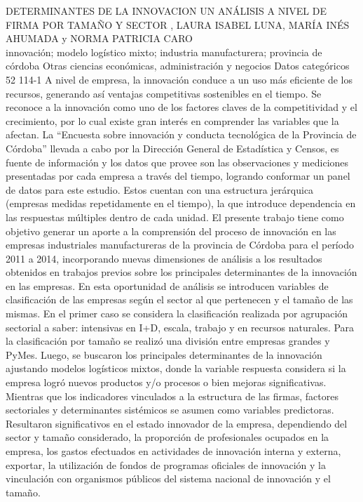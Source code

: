 \A
{DETERMINANTES DE LA INNOVACION UN ANÁLISIS A NIVEL DE FIRMA POR TAMAÑO Y SECTOR}
{, LAURA ISABEL LUNA, MARÍA INÉS AHUMADA y NORMA PATRICIA CARO}
{
\\}
{innovación; modelo logístico mixto; industria manufacturera; provincia de córdoba} 
 {Otras ciencias económicas, administración y negocios} 
 {Datos categóricos} 
 {52} 
 {114-1}
{A nivel de empresa, la innovación conduce a un uso más eficiente de los recursos, generando así ventajas competitivas sostenibles en el tiempo. Se reconoce a la innovación como uno de los factores claves de la competitividad y el crecimiento, por lo cual existe gran interés en comprender las variables que la afectan. La “Encuesta sobre innovación y conducta tecnológica de la Provincia de Córdoba” llevada a cabo por la Dirección General de Estadística y Censos, es fuente de información y los datos que provee son las observaciones y mediciones presentadas por cada empresa a través del tiempo, logrando conformar un panel de datos para este estudio. Estos cuentan con una estructura jerárquica (empresas medidas repetidamente en el tiempo), la que introduce dependencia en las respuestas múltiples dentro de cada unidad. El presente trabajo tiene como objetivo generar un aporte a la comprensión del proceso de innovación en las empresas industriales manufactureras de la provincia de Córdoba para el período 2011 a 2014, incorporando nuevas dimensiones de análisis a los resultados obtenidos en trabajos previos sobre los principales determinantes de la innovación en las empresas. En esta oportunidad de análisis se introducen variables de clasificación de las empresas según el sector al que pertenecen y el tamaño de las mismas. En el primer caso se considera la clasificación realizada por agrupación sectorial a saber: intensivas en I+D, escala, trabajo y en recursos naturales. Para la clasificación por tamaño se realizó una división entre empresas grandes y PyMes. Luego, se buscaron los principales determinantes de la innovación ajustando modelos logísticos mixtos, donde la variable respuesta considera si la empresa logró nuevos productos y/o procesos o bien mejoras significativas. Mientras que los indicadores vinculados a la estructura de las firmas, factores sectoriales y determinantes sistémicos se asumen como variables predictoras. Resultaron significativos en el estado innovador de la empresa, dependiendo del sector y tamaño considerado, la proporción de profesionales ocupados en la empresa, los gastos efectuados en actividades de innovación interna y externa, exportar, la utilización de fondos de programas oficiales de innovación y la vinculación con organismos públicos del sistema nacional de innovación y el tamaño. }

